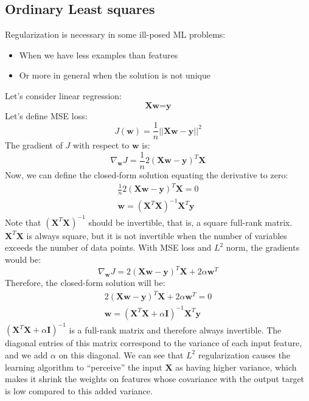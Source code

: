 \subsection{Ordinary Least squares}
Regularization is necessary in some ill-posed ML problems:
\begin{itemize}
    \item When we have less examples than features

    \item Or more in general when the solution is not unique
\end{itemize}
Let's consider linear regression:
\[\textbf{Xw} = \textbf{y}\]
Let's define MSE loss:
\[J(\textbf{w}) = \frac{1}{n}||\textbf{Xw} - \textbf{y}||^2\]
The gradient of $J$ with respect to $\textbf{w}$ is:
\[\nabla_\textbf{w}J = \frac{1}{n}2(\textbf{Xw} - \textbf{y})^T \textbf{X}\]
Now, we can define the closed-form solution equating the derivative to zero:
\[\begin{split}
    \frac{1}{n}2(\textbf{Xw} - \textbf{y})^T \textbf{X} = 0\\
    \textbf{w} = (\textbf{X}^T \textbf{X})^{-1}\textbf{X}^T\textbf{y}
\end{split}\]
Note that $(\textbf{X}^T \textbf{X})^{-1}$ should be invertible, that is, a square full-rank matrix. $\textbf{X}^T \textbf{X}$ is always square, but it is not invertible when the number of variables exceeds the number of data points.\newline\newline
With MSE loss and $L^2$ norm, the gradients would be:
\[\nabla_\textbf{w}J = 2(\textbf{Xw} - \textbf{y})^T \textbf{X} + 2\alpha \textbf{w}^T\]
Therefore, the closed-form solution will be:
\[\begin{split}
    2(\textbf{Xw} - \textbf{y})^T \textbf{X} + 2\alpha \textbf{w}^T = 0\\
    \textbf{w} = (\textbf{X}^T \textbf{X} + \alpha \textbf{I})^{-1}\textbf{X}^T \textbf{y}
\end{split}\]
$(\textbf{X}^T \textbf{X} + \alpha \textbf{I})^{-1}$ is a full-rank matrix and therefore always invertible. The diagonal entries of this matrix correspond to the variance of each input feature, and we add $\alpha$ on this diagonal. We can see that $L^2$ regularization causes the learning algorithm to “perceive” the input $\textbf{X}$ as having higher variance, which makes it shrink the weights on features whose covariance with the output target is low compared to this added variance.


